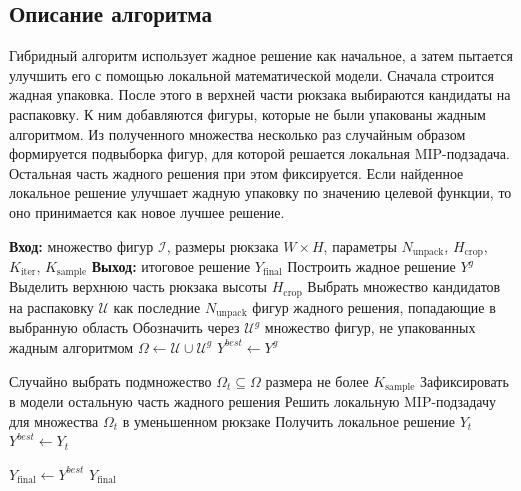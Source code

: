\documentclass[a4paper]{article}
\begin{document}
    \newpage

    \subsection{Описание алгоритма}

    Гибридный алгоритм использует жадное решение как начальное, а затем пытается улучшить
    его с помощью локальной математической модели. Сначала строится жадная упаковка. После
    этого в верхней части рюкзака выбираются кандидаты на распаковку. К ним добавляются
    фигуры, которые не были упакованы жадным алгоритмом. Из полученного множества несколько
    раз случайным образом формируется подвыборка фигур, для которой решается локальная
    MIP-подзадача. Остальная часть жадного решения при этом фиксируется. Если найденное
    локальное решение улучшает жадную упаковку по значению целевой функции, то оно
    принимается как новое лучшее решение.

    \begin{algorithm}[tbp]
    \caption{Гибридный алгоритм}
    \label{alg:hybrid_short}
    \small
    \begin{algorithmic}[1]
    \State \textbf{Вход:} множество фигур $\mathcal{I}$, размеры рюкзака $W \times H$, параметры $N_{\text{unpack}}$, $H_{\text{crop}}$, $K_{\text{iter}}$, $K_{\text{sample}}$
    \State \textbf{Выход:} итоговое решение $Y_{\text{final}}$
    \State Построить жадное решение $Y^g$
    \State Выделить верхнюю часть рюкзака высоты $H_{\text{crop}}$
    \State Выбрать множество кандидатов на распаковку $\mathcal{U}$ как последние $N_{\text{unpack}}$ фигур жадного решения, попадающие в выбранную область
    \State Обозначить через $\mathcal{U}^g$ множество фигур, не упакованных жадным алгоритмом
    \State $\Omega \gets \mathcal{U} \cup \mathcal{U}^g$
    \State $Y^{best} \gets Y^g$

        \State Случайно выбрать подмножество $\Omega_t \subseteq \Omega$ размера не более $K_{\text{sample}}$
        \State Зафиксировать в модели остальную часть жадного решения
        \State Решить локальную MIP-подзадачу для множества $\Omega_t$ в уменьшенном рюкзаке
        \State Получить локальное решение $Y_t$
            \State $Y^{best} \gets Y_t$
        \EndIf
    \EndFor

    \State $Y_{\text{final}} \gets Y^{best}$
    \State \Return $Y_{\text{final}}$
    \end{algorithmic}
    \end{algorithm}
\end{document}
